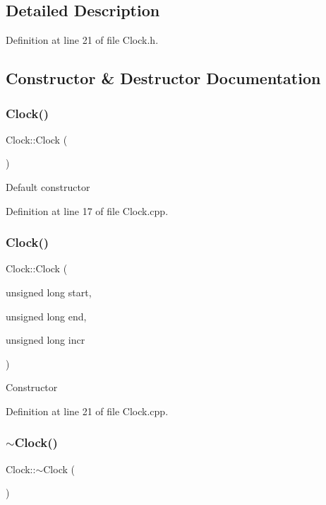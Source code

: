 \subsection{Detailed Description}


Definition at line 21 of file Clock.\+h.



\subsection{Constructor \& Destructor Documentation}
\mbox{\label{class_clock_adbc370eb6b5f8d01645cf440188160a8}} 
\subsubsection{Clock()\hspace{0.1cm}{\footnotesize\ttfamily [1/2]}}
{\footnotesize\ttfamily Clock\+::\+Clock (\begin{DoxyParamCaption}{ }\end{DoxyParamCaption})}

Default constructor 

Definition at line 17 of file Clock.\+cpp.

\mbox{\label{class_clock_a89a798e152f8eba2f6eb80ec92b26ece}} 
\subsubsection{Clock()\hspace{0.1cm}{\footnotesize\ttfamily [2/2]}}
{\footnotesize\ttfamily Clock\+::\+Clock (\begin{DoxyParamCaption}\item[{unsigned long}]{start,  }\item[{unsigned long}]{end,  }\item[{unsigned long}]{incr }\end{DoxyParamCaption})}

Constructor 

Definition at line 21 of file Clock.\+cpp.

\mbox{\label{class_clock_afc976ce68fa85e15cc06f9ed47bddb7c}} 
\subsubsection{$\sim$Clock()}
{\footnotesize\ttfamily Clock\+::$\sim$\+Clock (\begin{DoxyParamCaption}{ }\end{DoxyParamCaption})\hspace{0.3cm}{\ttfamily [virtual]}}

